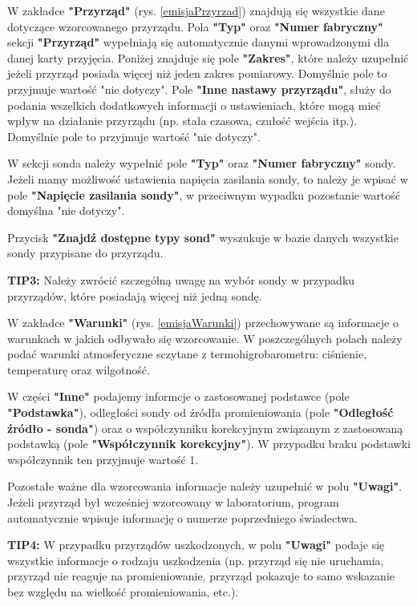 	W zakładce \textbf{"Przyrząd"} (rys. \ref{emisjaPrzyrzad}) znajdują się wszystkie dane dotyczące wzorcowanego przyrządu. Pola \textbf{"Typ"} oraz \textbf{"Numer fabryczny"} sekcji \textbf{"Przyrząd"} wypełniają się automatycznie danymi wprowadzonymi dla danej karty przyjęcia. Poniżej znajduje się pole \textbf{"Zakres"}, które należy uzupełnić jeżeli przyrząd posiada więcej niż jeden zakres pomiarowy. Domyślnie pole to przyjmuje wartość "nie dotyczy". Pole \textbf{"Inne nastawy przyrządu"}, służy do podania wszelkich dodatkowych informacji o ustawieniach, które mogą mieć wpływ na działanie przyrządu (np. stała czasowa, czułość wejścia itp.). Domyślnie pole to przyjmuje wartość "nie dotyczy".
	
	W sekcji sonda należy wypełnić pole \textbf{"Typ"} oraz \textbf{"Numer fabryczny"} sondy. Jeżeli mamy możliwość ustawienia napięcia zasilania sondy, to należy je wpisać w pole \textbf{"Napięcie zasilania sondy"}, w przeciwnym wypadku pozostanie wartość domyślna "nie dotyczy".
	
	Przycisk \textbf{"Znajdź dostępne typy sond"} wyszukuje w bazie danych wszystkie sondy przypisane do przyrządu.
	
	\textbf{TIP3:} Należy zwrócić szczególną uwagę na wybór sondy w przypadku przyrządów, które posiadają więcej niż jedną sondę.
	
	W zakładce \textbf{"Warunki"} (rys. \ref{emisjaWarunki}) przechowywane są informacje o warunkach w jakich odbywało się wzorcowanie. W poszczególnych polach należy podać warunki atmosferyczne sczytane z termohigrobarometru: ciśnienie, temperaturę oraz wilgotność.
	
	W części \textbf{"Inne"} podajemy informcje o zastosowanej podstawce (pole \textbf{"Podstawka"}), odległości sondy od źródła promieniowania (pole \textbf{"Odległość źródło - sonda"}) oraz o współczynniku korekcyjnym związanym z zastosowaną podstawką (pole \textbf{"Współczynnik korekcyjny"}). W przypadku braku podstawki współczynnik ten przyjmuje wartość 1.
	
	Pozostałe ważne dla wzorcowania informacje należy uzupełnić w polu \textbf{"Uwagi"}. Jeżeli przyrząd był wcześniej wzorcowany w laboratorium, program automatycznie wpisuje informację o numerze poprzedniego świadectwa.  
	
	\textbf{TIP4:} W przypadku przyrządów uszkodzonych, w polu \textbf{"Uwagi"} podaje się wszystkie informacje o rodzaju uszkodzenia (np. przyrząd się nie uruchamia, przyrząd nie reaguje na promieniowanie, przyrząd pokazuje to samo wskazanie bez względu na wielkość promieniowania, etc.).
	
